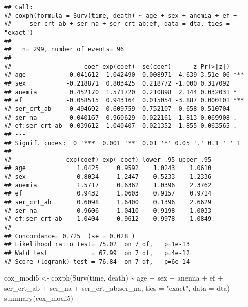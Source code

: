 \documentclass[
]{article}
\newenvironment{Shaded}{\begin{snugshade}}{\end{snugshade}}
\newcommand{\AttributeTok}[1]{\textcolor[rgb]{0.77,0.63,0.00}{#1}}
\newcommand{\FunctionTok}[1]{\textcolor[rgb]{0.00,0.00,0.00}{#1}}
\newcommand{\NormalTok}[1]{#1}
\newcommand{\OtherTok}[1]{\textcolor[rgb]{0.56,0.35,0.01}{#1}}
\newcommand{\SpecialCharTok}[1]{\textcolor[rgb]{0.00,0.00,0.00}{#1}}
\newcommand{\StringTok}[1]{\textcolor[rgb]{0.31,0.60,0.02}{#1}}
\begin{document}
\begin{verbatim}
## Call:
## coxph(formula = Surv(time, death) ~ age + sex + anemia + ef + 
##     ser_crt_ab + ser_na + ser_crt_ab:ef, data = dta, ties = "exact")
## 
##   n= 299, number of events= 96 
## 
##                    coef exp(coef)  se(coef)      z Pr(>|z|)    
## age            0.041612  1.042490  0.008971  4.639 3.51e-06 ***
## sex           -0.218871  0.803425  0.218772 -1.000 0.317092    
## anemia         0.452170  1.571720  0.210898  2.144 0.032031 *  
## ef            -0.058515  0.943164  0.015054 -3.887 0.000101 ***
## ser_crt_ab    -0.494692  0.609759  0.752107 -0.658 0.510704    
## ser_na        -0.040167  0.960629  0.022161 -1.813 0.069908 .  
## ef:ser_crt_ab  0.039612  1.040407  0.021352  1.855 0.063565 .  
## ---
## Signif. codes:  0 '***' 0.001 '**' 0.01 '*' 0.05 '.' 0.1 ' ' 1
## 
##               exp(coef) exp(-coef) lower .95 upper .95
## age              1.0425     0.9592    1.0243    1.0610
## sex              0.8034     1.2447    0.5233    1.2336
## anemia           1.5717     0.6362    1.0396    2.3762
## ef               0.9432     1.0603    0.9157    0.9714
## ser_crt_ab       0.6098     1.6400    0.1396    2.6629
## ser_na           0.9606     1.0410    0.9198    1.0033
## ef:ser_crt_ab    1.0404     0.9612    0.9978    1.0849
## 
## Concordance= 0.725  (se = 0.028 )
## Likelihood ratio test= 75.02  on 7 df,   p=1e-13
## Wald test            = 67.99  on 7 df,   p=4e-12
## Score (logrank) test = 76.84  on 7 df,   p=6e-14
\end{verbatim}

\begin{Shaded}
\begin{Highlighting}[]
\NormalTok{cox\_modi5 }\OtherTok{\textless{}{-}} \FunctionTok{coxph}\NormalTok{(}\FunctionTok{Surv}\NormalTok{(time, death) }\SpecialCharTok{\textasciitilde{}}\NormalTok{ age }\SpecialCharTok{+}\NormalTok{ sex }\SpecialCharTok{+}\NormalTok{ anemia }\SpecialCharTok{+}\NormalTok{ ef }\SpecialCharTok{+}\NormalTok{ ser\_crt\_ab }\SpecialCharTok{+}\NormalTok{ ser\_na }\SpecialCharTok{+}\NormalTok{ ser\_crt\_ab}\SpecialCharTok{:}\NormalTok{ser\_na, }\AttributeTok{ties =} \StringTok{"exact"}\NormalTok{, }\AttributeTok{data =}\NormalTok{ dta)}
\FunctionTok{summary}\NormalTok{(cox\_modi5)}
\end{Highlighting}
\end{Shaded}
\end{document}
